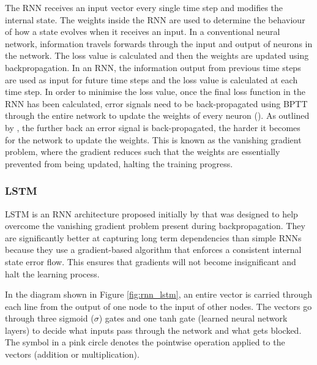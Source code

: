 The \acrshort{RNN} receives an input vector every single time step and modifies the internal state. The weights inside the \acrshort{RNN} are used to determine the behaviour of how a state evolves when it receives an input. 
In a conventional neural network, information travels forwards through the input and output of neurons in the network. The loss value is calculated and then the weights are updated using backpropagation.
In an \acrshort{RNN}, the information output from previous time steps are used as input for future time steps and the loss value is calculated at each time step. In order to minimise the loss value, once the final loss function in the \acrshort{RNN} has been calculated, error signals need to be back-propagated using \acrfull{BPTT} through the entire network to update the weights of every neuron (\cite{salehinejad_recent_rnn_2018}).
As outlined by \cite{bengio_learning_1994}, the further back an error signal is back-propagated, the harder it becomes for the network to update the weights. This is known as the vanishing gradient problem, where the gradient reduces such that the weights are essentially prevented from being updated, halting the training progress.

\subsubsection{\acrlong{LSTM}}

\acrfull{LSTM} is an \acrshort{RNN} architecture proposed initially by \cite{hochreiter_long_1997} that was designed to help overcome the vanishing gradient problem present during backpropagation. They are significantly better at capturing long term dependencies than simple \acrshort{RNN}s  because they use a gradient-based algorithm that enforces a consistent internal state error flow. This ensures that gradients will not become insignificant and halt the learning process.

In the diagram shown in Figure \ref{fig:rnn_lstm}, an entire vector is carried through each line from the output of one node to the input of other nodes. The vectors go through three sigmoid ($\sigma$) gates and one tanh gate (learned neural network layers) to decide what inputs pass through the network and what gets blocked. The symbol in a pink circle denotes the pointwise operation applied to the vectors (addition or multiplication).

